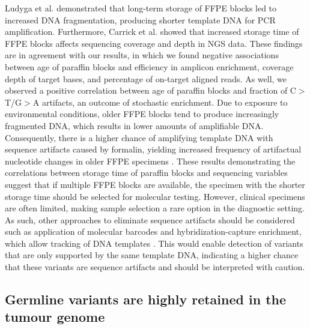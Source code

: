 Ludyga et al. \cite{Ludyga2012} demonstrated that long-term storage of FFPE blocks led to increased DNA fragmentation, producing shorter template DNA for PCR amplification. Furthermore, Carrick et al. \cite{Carrick2015} showed that increased storage time of FFPE blocks affects sequencing coverage and depth in NGS data. These findings are in agreement with our results, in which we found negative associations between age of paraffin blocks and efficiency in amplicon enrichment, coverage depth of target bases, and percentage of on-target aligned reads. As well, we observed a positive correlation between age of paraffin blocks and fraction of C$>$T/G$>$A artifacts, an outcome of stochastic enrichment. Due to exposure to environmental conditions, older FFPE blocks tend to produce increasingly fragmented DNA, which results in lower amounts of amplifiable DNA. Consequently, there is a higher chance of amplifying template DNA with sequence artifacts caused by formalin, yielding increased frequency of artifactual nucleotide changes in older FFPE specimens \cite{Wong2014}. These results demonstrating the correlations between storage time of paraffin blocks and sequencing variables suggest that if multiple FFPE blocks are available, the specimen with the shorter storage time should be selected for molecular testing. However, clinical specimens are often limited, making sample selection a rare option in the diagnostic setting. As such, other approaches to eliminate sequence artifacts should be considered such as application of molecular barcodes and hybridization-capture enrichment, which allow tracking of DNA templates \cite{Eijkelenboom2016, Samorodnitsky2015, Peng2015, Wong2013}. This would enable detection of variants that are only supported by the same template DNA, indicating a higher chance that these variants are sequence artifacts and should be interpreted with caution.

\subsection{Germline variants are highly retained in the tumour genome}

